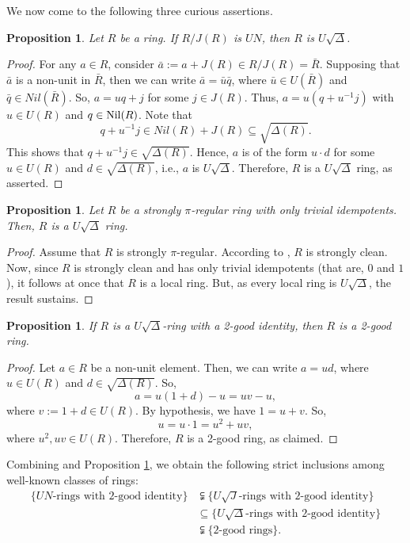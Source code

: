 \documentclass[11pt]{amsart}
\newtheorem{proposition}[theorem]{Proposition}
\theoremstyle{definition}
\begin{document}
We now come to the following three curious assertions.

\begin{proposition}
Let $R$ be a ring. If $R/J(R)$ is $UN$, then $R$ is $U\sqrt{\Delta}$.
\end{proposition}

\begin{proof}
For any $a \in R$, consider $\bar a:=a + J(R) \in R/J(R)=\bar R$. Supposing that $\bar a$ is a non-unit in $\bar R$, then we can write $\bar a = \bar u \bar q$, where $\bar u \in U(\bar R)$ and $\bar q \in Nil(\bar R)$. So, $a = uq + j$ for some $j \in J(R)$. Thus, $a = u(q + u^{-1}j)$ with $u \in U(R)$ and $q \in {\rm Nil}(R)$. Note that
	\[
	q + u^{-1}j \in Nil(R) + J(R) \subseteq \sqrt{\Delta(R)}.
	\]
This shows that $q + u^{-1}j \in \sqrt{\Delta(R)}$. Hence, $a$ is of the form $u \cdot d$ for some $u \in U(R)$ and $d \in \sqrt{\Delta(R)}$, i.e., $a$ is $U\sqrt{\Delta}$. Therefore, $R$ is a $U\sqrt{\Delta}$ ring, as asserted.
\end{proof}

\begin{proposition}
Let $R$ be a strongly $\pi$-regular ring with only trivial idempotents. Then, $R$ is a $U\sqrt{\Delta}$ ring.
\end{proposition}

\begin{proof}
Assume that $R$ is strongly $\pi$-regular. According to \cite[Proposition 2.6]{bur}, $R$ is strongly clean. Now, since $R$ is strongly clean and has only trivial idempotents (that are, $0$ and $1$), it follows at once that $R$ is a local ring. But, as every local ring is $U\sqrt{\Delta}$, the result sustains.
\end{proof}

\begin{proposition}\label{good}
If $R$ is a $U\sqrt{\Delta}$-ring with a 2-good identity, then $R$ is a 2-good ring.
\end{proposition}

\begin{proof}
Let $a \in R$ be a non-unit element. Then, we can write $a = ud$, where $u \in U(R)$ and $d \in \sqrt{\Delta(R)}$. So,
	\[
	a = u(1 + d) - u = uv - u,
	\]
where $v := 1 + d \in U(R)$. By hypothesis, we have $1 = u + v$. So,
	\[
	u = u \cdot 1 = u^2 + uv,
	\]
where $u^2, uv\in U(R)$. Therefore, $R$ is a 2-good ring, as claimed.
\end{proof}

Combining \cite[Example~3.6]{sd} and Proposition \ref{good}, we obtain the following strict inclusions among well-known classes of rings:
\begin{align*}
	\{UN\text{-rings with 2-good identity}\} &\subsetneqq \{U\sqrt{J}\text{-rings with 2-good identity}\} \\
	&\subseteq {\{U\sqrt{\Delta}\text{-rings with 2-good identity}\}} \\
	&\subsetneqq \{2\text{-good rings}\}.
\end{align*}
\end{document}
